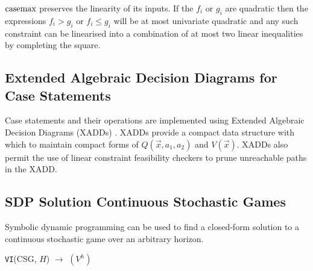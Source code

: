 $\mathrm{casemax}$ preserves the linearity of its inputs. If the $f_i$ or 
$g_i$ are quadratic then the expressions $f_i > g_i$ or 
$f_i \leq g_i$ will be at most univariate quadratic and any such 
constraint can be linearised into a combination of at most two linear 
inequalities by completing the square.

\subsection{Extended Algebraic Decision Diagrams for Case Statements}

Case statements and their operations are implemented using Extended 
Algebraic Decision Diagrams (XADDs) \cite{Sanner_UAI_2011}.
XADDs provide a compact data structure with which to maintain
compact forms of $Q(\vec{x}, a_1, a_2)$ and $V(\vec{x})$. 
XADDs also permit the use of linear constraint feasibility checkers to 
prune unreachable paths in the XADD.

\subsection{SDP Solution Continuous Stochastic Games}

Symbolic dynamic programming can be used to find a closed-form
solution to a continuous stochastic game over an arbitrary horizon.

\incmargin{.5em}
\linesnumbered
\begin{algorithm}[H]
  \vspace{-.5mm}
  \dontprintsemicolon
  
  \caption{
    \footnotesize \texttt{VI}(CSG, $H$) $\longrightarrow$ $(V^h)$ 
    \label{alg:vi}
  }
  \vspace{-1mm}
\end{algorithm}
\decmargin{.5em}

